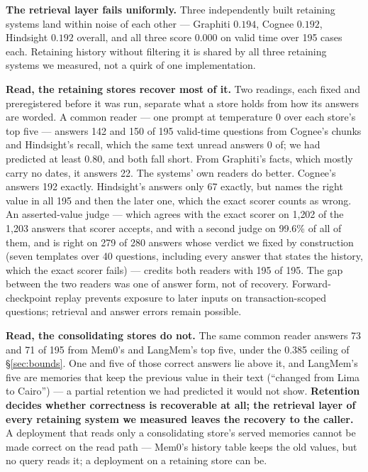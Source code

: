 \documentclass[conference]{IEEEtran}
\begin{document}
\textbf{The retrieval layer fails uniformly.} Three independently built
retaining systems land within noise of each other --- Graphiti $0.194$, Cognee
$0.192$, Hindsight $0.192$ overall, and all three score $0.000$ on valid time
over 195 cases each. Retaining history without filtering it is shared by all
three retaining systems we measured, not a quirk of one implementation.

\textbf{Read, the retaining stores recover most of it.} Two readings, each
fixed and preregistered before it was run, separate what a store holds from how
its answers are worded. A common reader --- one prompt at temperature 0 over
each store's top five --- answers 142 and 150 of 195 valid-time questions from
Cognee's chunks and Hindsight's recall, which the same text unread answers 0 of;
we had predicted at least 0.80, and both fall short. From Graphiti's facts, which
mostly carry no dates, it answers 22. The systems' own readers do better.
Cognee's answers 192 exactly. Hindsight's answers only 67 exactly, but names
the right value in all 195 and then the later one, which the exact scorer
counts as wrong. An asserted-value judge
--- which agrees with the exact scorer on 1{,}202 of the 1{,}203 answers that scorer
accepts, and with a second judge on 99.6\% of all of them, and is right on 279
of 280 answers whose verdict we fixed by construction (seven templates over 40
questions, including every answer that states the history, which the exact
scorer fails) --- credits both readers with 195 of 195. The gap between the two readers was one of answer form,
not of recovery. Forward-checkpoint replay prevents exposure to later inputs on
transaction-scoped questions; retrieval and answer errors remain possible.

\textbf{Read, the consolidating stores do not.} The same common reader answers
73 and 71 of 195 from Mem0's and LangMem's top five, under the 0.385 ceiling of
\S\ref{sec:bounds}. One and five of those correct answers lie above it, and
LangMem's five are memories that keep the previous value in their text
(``changed from Lima to Cairo'') --- a partial retention we had predicted it would
not show. \textbf{Retention decides whether correctness is recoverable at all;
the retrieval layer of every retaining system we measured leaves the recovery to
the caller.} A deployment that reads only a consolidating store's served
memories cannot be made correct on the read path --- Mem0's history table keeps
the old values, but no query reads it; a deployment on a retaining store can be.
\end{document}
